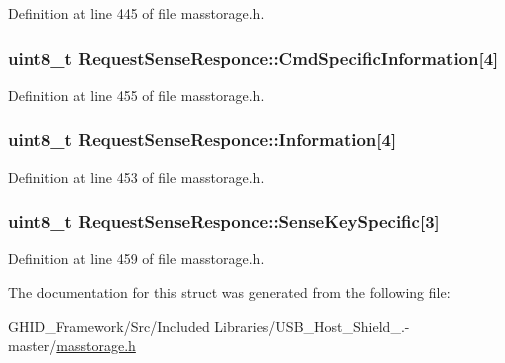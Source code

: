 \-Definition at line 445 of file masstorage.\-h.

\hypertarget{struct_request_sense_responce_ab2f0cab24692ca29dffc231f31198726}{
\subsubsection[{\-Cmd\-Specific\-Information}]{\setlength{\rightskip}{0pt plus 5cm}uint8\-\_\-t {\bf \-Request\-Sense\-Responce\-::\-Cmd\-Specific\-Information}\mbox{[}4\mbox{]}}}\label{struct_request_sense_responce_ab2f0cab24692ca29dffc231f31198726}


\-Definition at line 455 of file masstorage.\-h.

\hypertarget{struct_request_sense_responce_a4342aa28405753a185d867060fec931e}{
\subsubsection[{\-Information}]{\setlength{\rightskip}{0pt plus 5cm}uint8\-\_\-t {\bf \-Request\-Sense\-Responce\-::\-Information}\mbox{[}4\mbox{]}}}\label{struct_request_sense_responce_a4342aa28405753a185d867060fec931e}


\-Definition at line 453 of file masstorage.\-h.

\hypertarget{struct_request_sense_responce_a61d034714befc2fa0fb7dcea30942324}{
\subsubsection[{\-Sense\-Key\-Specific}]{\setlength{\rightskip}{0pt plus 5cm}uint8\-\_\-t {\bf \-Request\-Sense\-Responce\-::\-Sense\-Key\-Specific}\mbox{[}3\mbox{]}}}\label{struct_request_sense_responce_a61d034714befc2fa0fb7dcea30942324}


\-Definition at line 459 of file masstorage.\-h.



\-The documentation for this struct was generated from the following file\-:\begin{DoxyCompactItemize}
\item 
\-G\-H\-I\-D\-\_\-\-Framework/\-Src/\-Included Libraries/\-U\-S\-B\-\_\-\-Host\-\_\-\-Shield\-\_.-\/master/\hyperlink{masstorage_8h}{masstorage.\-h}\end{DoxyCompactItemize}
